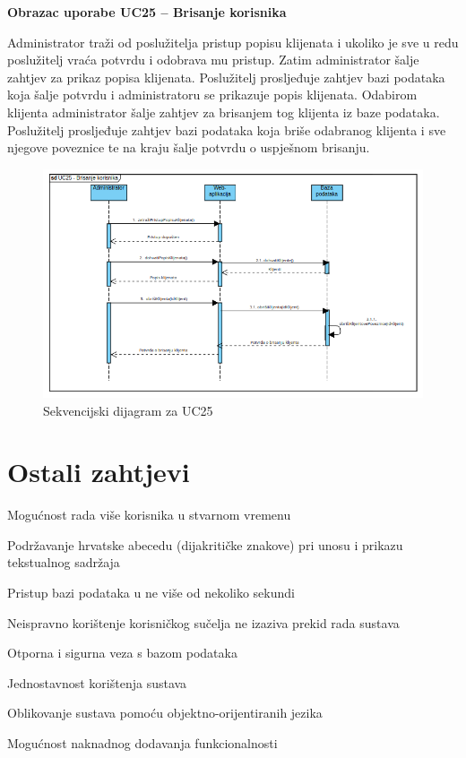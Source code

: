 				\textbf{Obrazac uporabe UC25 – Brisanje korisnika}

				Administrator traži od poslužitelja pristup popisu klijenata i ukoliko je 
				sve u redu poslužitelj vraća potvrdu i odobrava mu pristup. Zatim 
				administrator šalje zahtjev za prikaz popisa klijenata. Poslužitelj 
				prosljeđuje zahtjev bazi podataka koja šalje potvrdu i administratoru 
				se prikazuje popis klijenata. Odabirom klijenta administrator šalje zahtjev 
				za brisanjem tog klijenta iz baze podataka. Poslužitelj prosljeđuje zahtjev 
				bazi podataka koja briše odabranog klijenta i sve njegove poveznice te na 
				kraju šalje potvrdu o uspješnom brisanju.
				
				\begin{figure}[H]
					\includegraphics[scale=0.6]{dijagrami/SD25.png} 
					\centering
					\caption{Sekvencijski dijagram za UC25}
					\label{fig:sd25}
				\end{figure}		
				\eject 

	
		\section{Ostali zahtjevi}
		\begin{packed_enum}
				
			\item Mogućnost rada više korisnika u stvarnom vremenu
			\item Podržavanje hrvatske abecedu (dijakritičke znakove) pri unosu i prikazu tekstualnog sadržaja				
			\item Pristup bazi podataka u ne više od nekoliko sekundi
			\item Neispravno korištenje korisničkog sučelja ne izaziva prekid rada sustava
			\item Otporna i sigurna veza s bazom podataka
			\item Jednostavnost korištenja sustava
			\item Oblikovanje sustava pomoću objektno-orijentiranih jezika
			\item Mogućnost naknadnog dodavanja funkcionalnosti
		\end{packed_enum}
				
			 
			 
			 
	